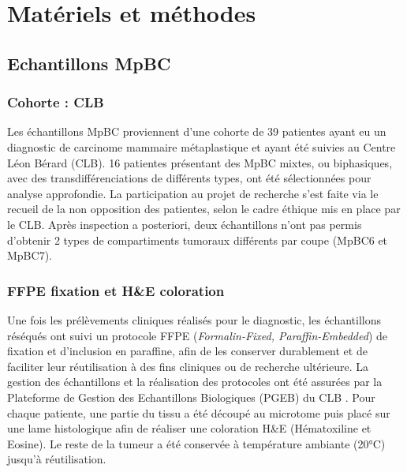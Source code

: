 \documentclass[11pt]{article}
\begin{document}
\newpage









\section{Matériels et méthodes}

\subsection{Echantillons MpBC}

\subsubsection{Cohorte : CLB}

Les échantillons MpBC proviennent d’une cohorte de 39 patientes ayant eu un diagnostic de carcinome mammaire métaplastique et ayant été suivies au Centre Léon Bérard (CLB). 16 patientes présentant des MpBC mixtes, ou biphasiques, avec des transdifférenciations de différents types, ont été sélectionnées pour analyse approfondie. La participation au projet de recherche s’est faite via le recueil de la non opposition des patientes, selon le cadre éthique mis en place par le CLB. Après inspection a posteriori, deux échantillons n’ont pas permis d’obtenir 2 types de compartiments tumoraux différents par coupe (MpBC6 et MpBC7).

\subsubsection{FFPE fixation et H\&E coloration }

Une fois les prélèvements cliniques réalisés pour le diagnostic, les échantillons réséqués ont suivi un protocole FFPE (\textit{Formalin-Fixed, Paraffin-Embedded}) de fixation et d’inclusion en paraffine, afin de les conserver durablement et de faciliter leur réutilisation à des fins cliniques ou de recherche ultérieure. La gestion des échantillons et la réalisation des protocoles ont été assurées par la Plateforme de Gestion des Echantillons Biologiques (PGEB) du CLB \cite{PGEB}. Pour chaque patiente, une partie du tissu a été découpé au microtome puis placé sur une lame histologique afin de réaliser une coloration H\&E (Hématoxiline et Eosine). Le reste de la tumeur a été conservée à température ambiante (20°C) jusqu’à réutilisation.
\end{document}
